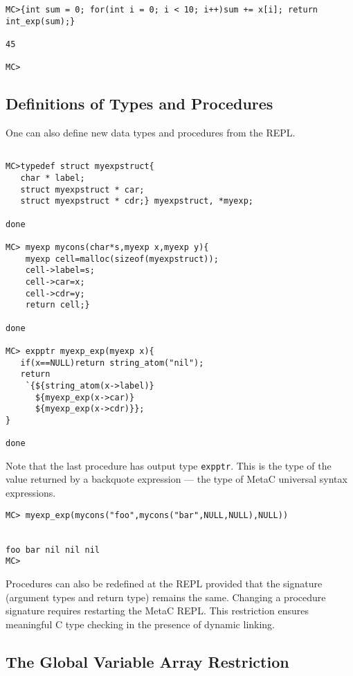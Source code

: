 \documentclass{article}
\begin{document}
\begin{verbatim}
MC>{int sum = 0; for(int i = 0; i < 10; i++)sum += x[i]; return int_exp(sum);}

45

MC>
\end{verbatim}

\subsection{Definitions of Types and Procedures}

One can also define new data types and procedures from the REPL.

\begin{verbatim}

MC>typedef struct myexpstruct{
   char * label;
   struct myexpstruct * car;
   struct myexpstruct * cdr;} myexpstruct, *myexp;

done

MC> myexp mycons(char*s,myexp x,myexp y){
    myexp cell=malloc(sizeof(myexpstruct));
    cell->label=s;
    cell->car=x;
    cell->cdr=y;
    return cell;}

done

MC> expptr myexp_exp(myexp x){
   if(x==NULL)return string_atom("nil");
   return
    `{${string_atom(x->label)}
      ${myexp_exp(x->car)}
      ${myexp_exp(x->cdr)}};
}

done
\end{verbatim}

Note that the last procedure has output type {\tt expptr}.  This is the type of the value returned by a backquote expression --- the
type of MetaC universal syntax expressions.

\begin{verbatim}
MC> myexp_exp(mycons("foo",mycons("bar",NULL,NULL),NULL))


foo bar nil nil nil
MC>
\end{verbatim}

Procedures can also be redefined at the REPL provided that the
signature (argument types and return type) remains the same. Changing a procedure signature
requires restarting the MetaC REPL.  This restriction ensures
meaningful C type checking in the presence of dynamic linking.

\subsection{The Global Variable Array Restriction}
\end{document}
